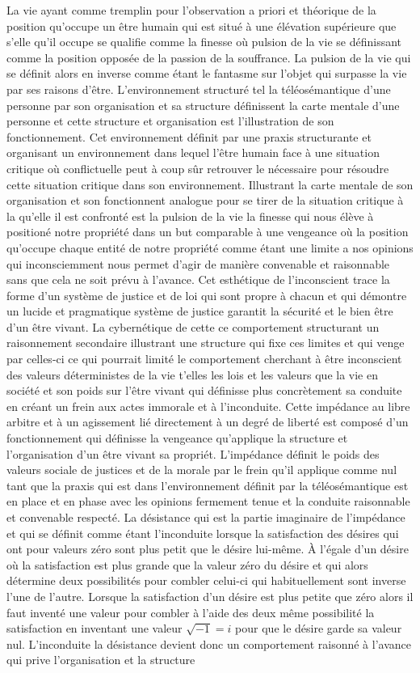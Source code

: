 \documentclass[12pt,a4paper]{article}
\begin{document}
La vie ayant comme tremplin pour l’observation a priori et théorique de la position qu’occupe un être humain qui est situé à une élévation supérieure que s’elle qu’il occupe se qualifie comme la finesse où pulsion de la vie se définissant comme la position opposée de la passion de la souffrance. La pulsion de la vie qui se définit alors en inverse comme étant le fantasme sur l’objet qui surpasse la vie par ses raisons d’être. L’environnement structuré tel la téléosémantique d’une personne par son organisation et sa structure définissent la carte mentale d’une personne et cette structure et organisation est l’illustration de son fonctionnement. Cet environnement définit par une praxis structurante et organisant un environnement dans lequel l’être humain face à une situation critique où conflictuelle peut à coup sûr retrouver le nécessaire pour résoudre cette situation critique dans son environnement. Illustrant la carte mentale de son organisation et son fonctionnent analogue pour se tirer de la situation critique à la qu’elle il est confronté est la pulsion de la vie la finesse qui nous élève à positioné notre propriété dans un but comparable à une vengeance où la position qu’occupe chaque entité de notre propriété comme étant une limite a nos opinions qui inconsciemment nous permet d’agir de manière convenable et raisonnable sans que cela ne soit prévu à l’avance. Cet esthétique de l’inconscient trace la forme d’un système de justice et de loi qui sont propre à chacun et qui démontre un lucide et pragmatique système de justice garantit la sécurité et le bien être d’un être vivant.  La cybernétique de cette ce comportement structurant un raisonnement secondaire illustrant une structure qui fixe ces limites et qui venge par celles-ci ce qui pourrait limité le comportement cherchant à être inconscient des valeurs déterministes de la vie t’elles les lois et les valeurs que la vie en société et son poids sur l’être vivant qui définisse plus concrètement sa conduite en créant un frein aux actes immorale et à l’inconduite. Cette impédance au libre arbitre et à un agissement lié directement à un degré de liberté est composé d’un fonctionnement qui définisse la vengeance qu’applique la structure et l’organisation d’un être vivant sa propriét. L’impédance définit le poids des valeurs sociale de justices et de la morale par le frein qu’il applique comme nul tant que la praxis qui est dans l’environnement définit par la téléosémantique est en place et en phase avec les opinions fermement tenue et la conduite raisonnable et convenable respecté. La désistance qui est la partie imaginaire de l’impédance et qui se définit comme étant l’inconduite lorsque la satisfaction des désires qui ont pour valeurs zéro sont plus petit que le désire lui-même. À l’égale d’un désire où la satisfaction  est plus grande que la valeur zéro du désire et qui alors détermine deux possibilités pour combler celui-ci qui habituellement sont inverse l’une de l’autre. Lorsque la satisfaction d’un désire est plus petite que zéro alors il faut inventé une valeur pour combler à l’aide des deux même possibilité la satisfaction en inventant une valeur $\sqrt{-1}=i$  pour que le désire garde sa valeur nul. L’inconduite la désistance devient donc un comportement raisonné à l’avance qui prive l’organisation et la structure 
\end{document}
